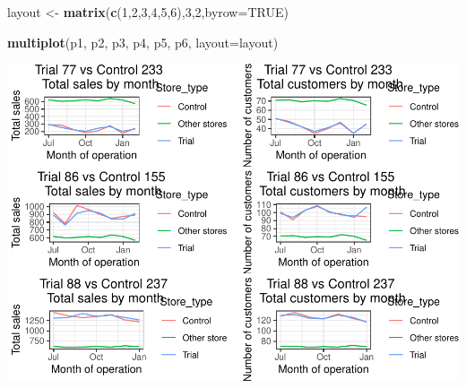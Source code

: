 \documentclass[]{article}
\newenvironment{Shaded}{\begin{snugshade}}{\end{snugshade}}
\newcommand{\DataTypeTok}[1]{\textcolor[rgb]{0.13,0.29,0.53}{#1}}
\newcommand{\DecValTok}[1]{\textcolor[rgb]{0.00,0.00,0.81}{#1}}
\newcommand{\KeywordTok}[1]{\textcolor[rgb]{0.13,0.29,0.53}{\textbf{#1}}}
\newcommand{\NormalTok}[1]{#1}
\newcommand{\OtherTok}[1]{\textcolor[rgb]{0.56,0.35,0.01}{#1}}
\newcommand{\StringTok}[1]{\textcolor[rgb]{0.31,0.60,0.02}{#1}}
\begin{document}
\begin{Shaded}
\begin{Highlighting}[]
\NormalTok{layout <-}\StringTok{ }\KeywordTok{matrix}\NormalTok{(}\KeywordTok{c}\NormalTok{(}\DecValTok{1}\NormalTok{,}\DecValTok{2}\NormalTok{,}\DecValTok{3}\NormalTok{,}\DecValTok{4}\NormalTok{,}\DecValTok{5}\NormalTok{,}\DecValTok{6}\NormalTok{),}\DecValTok{3}\NormalTok{,}\DecValTok{2}\NormalTok{,}\DataTypeTok{byrow=}\OtherTok{TRUE}\NormalTok{)}

\KeywordTok{multiplot}\NormalTok{(p1, p2, p3, p4, p5, p6, }\DataTypeTok{layout=}\NormalTok{layout)}
\end{Highlighting}
\end{Shaded}

\includegraphics{Task2_files/figure-latex/unnamed-chunk-18-1.pdf}
\end{document}
